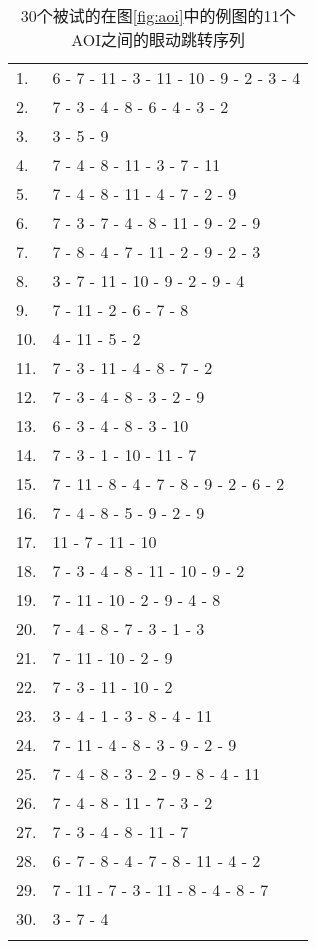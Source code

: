 \documentclass[master, fontset=mac, openany, oneside, zihao=-4]{sjtuthesis}
\begin{document}
\begin{table}[H]
  \begin{tabular}{ll}
    1. & 6 - 7 - 11 - 3 - 11 - 10 - 9 - 2 - 3 - 4\\
    2. & 7 - 3 - 4 - 8 - 6 - 4 - 3 - 2\\
    3. & 3 - 5 - 9\\
    4. & 7 - 4 - 8 - 11 - 3 - 7 - 11\\
    5. & 7 - 4 - 8 - 11 - 4 - 7 - 2 - 9\\
    6. & 7 - 3 - 7 - 4 - 8 - 11 - 9 - 2 - 9\\
    7. & 7 - 8 - 4 - 7 - 11 - 2 - 9 - 2 - 3\\
    8. & 3 - 7 - 11 - 10 - 9 - 2 - 9 - 4\\
    9. & 7 - 11 - 2 - 6 - 7 - 8\\
    10.& 4 - 11 - 5 - 2\\
    11.& 7 - 3 - 11 - 4 - 8 - 7 - 2\\
    12.& 7 - 3 - 4 - 8 - 3 - 2 - 9\\
    13.& 6 - 3 - 4 - 8 - 3 - 10\\
    14.& 7 - 3 - 1 - 10 - 11 - 7\\
    15.& 7 - 11 - 8 - 4 - 7 - 8 - 9 - 2 - 6 - 2\\
    16.& 7 - 4 - 8 - 5 - 9 - 2 - 9\\
    17.& 11 - 7 - 11 - 10\\
    18.& 7 - 3 - 4 - 8 - 11 - 10 - 9 - 2\\
    19.& 7 - 11 - 10 - 2 - 9 - 4 - 8\\
    20.& 7 - 4 - 8 - 7 - 3 - 1 - 3\\
    21.& 7 - 11 - 10 - 2 - 9\\
    22.& 7 - 3 - 11 - 10 - 2\\
    23.& 3 - 4 - 1 - 3 - 8 - 4 - 11\\
    24.& 7 - 11 - 4 - 8 - 3 - 9 - 2 - 9\\
    25.& 7 - 4 - 8 - 3 - 2 - 9 - 8 - 4 - 11\\
    26.& 7 - 4 - 8 - 11 - 7 - 3 - 2 \\
    27.& 7 - 3 - 4 - 8 - 11 - 7\\
    28.& 6 - 7 - 8 - 4 - 7 - 8 - 11 - 4 - 2\\
    29.& 7 - 11 - 7 - 3 - 11 - 8 - 4 - 8 - 7\\
    30.& 3 - 7 - 4\\
    \\
  \end{tabular}
  \caption{30个被试的在图\ref{fig:aoi}中的例图的11个AOI之间的眼动跳转序列}
  \label{tab:seq}
\end{table}
\end{document}
